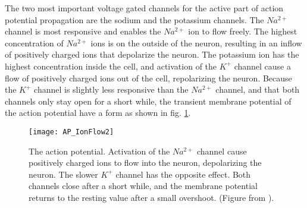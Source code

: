 		The two most important voltage gated channels for the active part of action potential propagation are the sodium and the potassium channels.
		The $Na^{2+}$ channel is most responsive and enables the $Na^{2+}$ ion to flow freely. %
		The highest concentration of $Na^{2+}$ ions is on the outside of the neuron, resulting in an inflow of positively charged ions that depolarize the neuron.
		The potassium ion has the highest concentration inside the cell, and activation of the $K^+$ channel cause a flow of positively charged ions out of the cell, repolarizing the neuron.
		Because the $K^+$ channel is slightly less responsive than the $Na^{2+}$ channel, and that both channels only stay open for a short while, 
			the transient membrane potential of the action potential have a form as shown in fig. \ref{figActionPotential}. 
		\cite{PrinciplesOfNeuralScience4edKAP09}
	

\begin{figure}[hbt!p]
    \centering
    \texttt{[image: AP\_IonFlow2]}
 	  \caption{The action potential. Activation of the $Na^{2+}$ channel cause positively charged ions to flow into the neuron, depolarizing the neuron. The slower $K^+$ channel has the opposite effect.
				Both channels close after a short while, and the membrane potential returns to the resting value after a small overshoot.
				(Figure from \cite{PrinciplesOfNeuralScience4edKAP09}).
			}
    \label{figActionPotential}
\end{figure}



